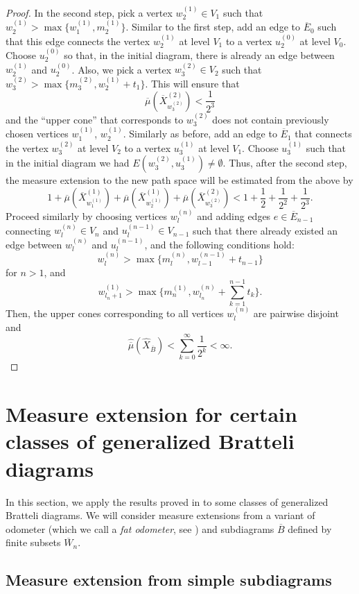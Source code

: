 \documentclass[11pt,reqno]{amsart}
\theoremstyle{definition}
\theoremstyle{remark}
\theoremstyle{plain}
\def\ol{\overline}
\def\ov{\overline}
\def\wh{\widehat}
\numberwithin{equation}{section}
\begin{document}
\begin{proof}
In the second step, pick a vertex $w_2^{(1)} \in V_1$ 
such that $w_2^{(1)} > \max\{w_1^{(1)}, m_2^{(1)}\}$. Similar to the first step, add an edge to $\ov E_0$ such that this edge connects the vertex $w^{(1)}_2$ at level $V_1$ to a vertex $u^{(0)}_2$ at level $V_0$. Choose $u^{(0)}_2$ so that, in the initial diagram, there is already an edge between $w^{(1)}_2$ and $u^{(0)}_2$. Also, we pick a vertex $w_3^{(2)} \in V_2$ 
such that $w_3^{(2)} > \max\{m_3^{(2)}, w_2^{(1)} + t_1\}$. This will ensure that
$$
\ov \mu (\ov X^{(2)}_{w_3^{(2)}}) < \frac{1}{2^3}
$$
and the ``upper cone'' that corresponds to $w_3^{(2)}$ does not contain previously chosen vertices $w_1^{(1)}$, $w_2^{(1)}$. 
Similarly as before, add an edge to $\ov E_1$ that connects the vertex $w^{(2)}_3$ at level $V_2$ to a vertex $u^{(1)}_3$ at level $V_1$. Choose $u^{(1)}_3$ such that in the initial diagram we had $E(w^{(2)}_3, u^{(1)}_3) \neq \emptyset$.
Thus, after the second step, the measure extension to the new path space will be estimated from the above by
$$
1 + \ov \mu(\ov X^{(1)}_{w^{(1)}_1}) + \ov \mu(\ov X^{(1)}_{w^{(1)}_2}) + \ov \mu(\ov X^{(2)}_{w^{(2)}_3}) 
< 1 + \frac{1}{2} + \frac{1}{2^2} + \frac{1}{2^3}. 
$$ Proceed similarly by choosing vertices $w^{(n)}_l$ and adding edges $e \in \ov E_{n-1}$ connecting $w^{(n)}_l \in V_n$ and $u^{(n-1)}_l \in V_{n-1}$ such that there already existed an edge between $w^{(n)}_l$ and $u^{(n-1)}_l$, and the following conditions hold: 
$$
w^{(n)}_l > \max\{m^{(n)}_l, w^{(n-1)}_{l-1} + t_{n-1}\}$$
for $n > 1$, and 
$$
w^{(1)}_{l_n + 1} > \max\{m^{(1)}_n, w^{(n)}_{l_{n}} + \sum_{k = 1}^{n-1}t_{k}\}.
$$ Then, the upper cones corresponding to all vertices $w_l^{(n)}$ are pairwise disjoint and
$$
\wh{\ol \mu} (\wh X_{\ol B}) < \sum_{k = 0}^{\infty} \frac{1}{2^k} < \infty. 
$$
\end{proof}


\section{Measure extension for certain classes of generalized Bratteli diagrams}
\label{sect ext from classes sbdgrms} 
In this section, we apply the results proved in  to some classes of generalized Bratteli diagrams. We will consider measure extensions from a variant of odometer (which we call a \textit{fat odometer}, see ) and subdiagrams $\ol B$ defined by finite 
subsets $\ol W_n$. 

\subsection{Measure extension from simple subdiagrams} 
\end{document}
